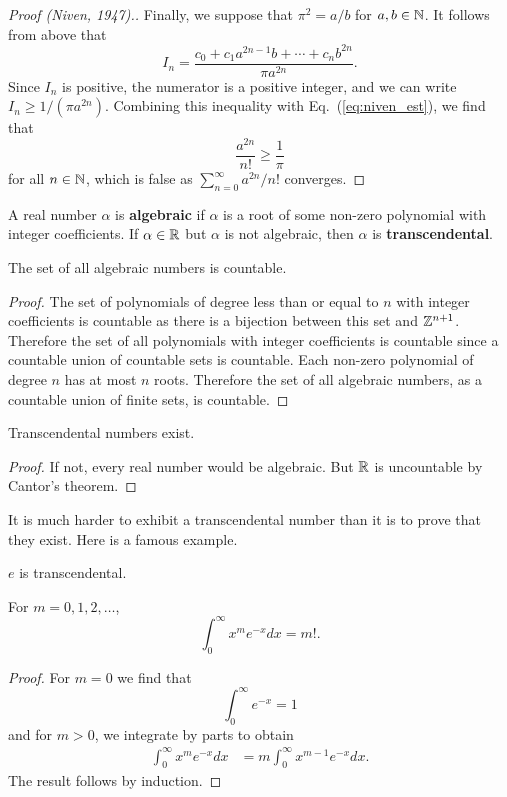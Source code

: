 \documentclass{mathnotes}
\begin{document}
\begin{proof}[Proof (Niven, 1947).]
    Finally, we suppose that $\pi^2=a/b$ for $a,b\in\mathbb{N}$. It follows from above that
    \[I_n=\frac{c_0+c_1a^{2n-1}b+\cdots+c_nb^{2n}}{\pi a^{2n}}.\]
    Since $I_n$ is positive, the numerator is a positive integer, and we can write $I_n\geq 1/(\pi a^{2n})$.
    Combining this inequality with Eq.~(\ref{eq:niven_est}), we find that
    \[\frac{a^{2n}}{n!}\geq \frac{1}{\pi}\]
    for all $n\in\mathbb{N}$, which is false as $\sum_{n=0}^\infty a^{2n}/n!$ converges.
\end{proof}

\begin{defn}
    A real number $\alpha$ is \textbf{algebraic} if $\alpha$ is a root of some non-zero polynomial
    with integer coefficients. If $\alpha\in\mathbb{R}$ but $\alpha$ is not algebraic, then $\alpha$ is
    \textbf{transcendental}.
\end{defn}

\begin{thm}
    The set of all algebraic numbers is countable.
\end{thm}
\begin{proof}
    The set of polynomials of degree less than or equal to $n$ with integer coefficients is countable as
    there is a bijection between this set and $\mathbb{Z}^{n+1}$. Therefore the set of all polynomials with integer
    coefficients is countable since a countable union of countable sets is countable. Each non-zero
    polynomial of degree $n$ has at most $n$ roots. Therefore the set of all algebraic numbers, as a
    countable union of finite sets, is countable.
\end{proof}

\begin{cor}
    Transcendental numbers exist.
\end{cor}
\begin{proof}
    If not, every real number would be algebraic. But $\mathbb{R}$ is uncountable by Cantor's theorem.
\end{proof}

It is much harder to exhibit a transcendental number than it is to prove that they exist. Here is a famous example.

\begin{thm}[Hermite, 1873]
   $e$ is transcendental.
\end{thm}

\begin{lem}
    For $m=0,1,2,\ldots$,
    \[\int_0^\infty x^me^{-x}dx = m!.\]
\end{lem}
\begin{proof}
    For $m=0$ we find that
    \[\int_0^\infty e^{-x}=1\]
    and for $m>0$, we integrate by parts to obtain
    \begin{align*}
        \int_0^\infty x^m e^{-x}dx &= m\int_0^\infty x^{m-1}e^{-x} dx.
    \end{align*}
    The result follows by induction.
\end{proof}
\end{document}
